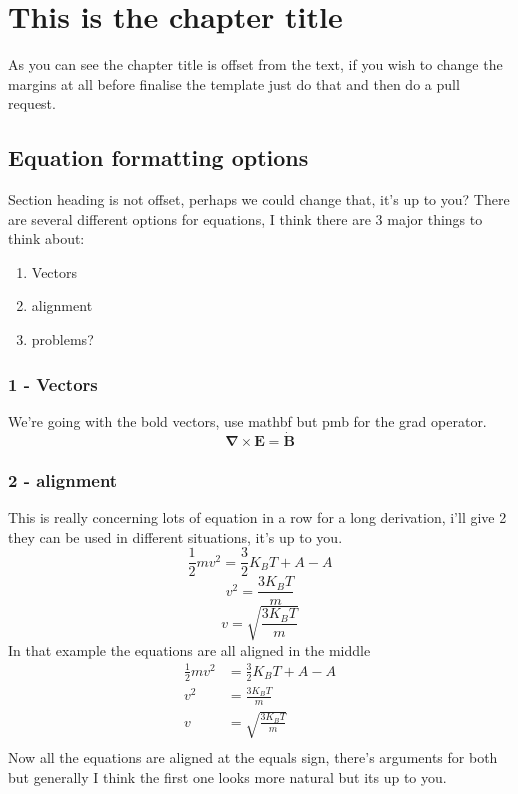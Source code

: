 \documentclass[11pt,oneside]{book}
\begin{document}
\dominitoc
\dominilof
\dominilot

\chapter{This is the chapter title}
\minitoc

\pagebreak
As you can see the chapter title is offset from the text, if you wish to change the margins at all before finalise the template just do that and then do a pull request.
%
\section{Equation formatting options}
Section heading is not offset, perhaps we could change that, it's up to you?
 There are several different options for equations, I think there are 3 major things to think about:
%
\begin{enumerate}
	\item Vectors
	\item alignment
	\item problems?
\end{enumerate}
%
\subsection{1 - Vectors}
We're going with the bold vectors, use mathbf{} but pmb for the grad operator.
%
$$\pmb{\nabla}\times\mathbf{E} = \mathbf{\dot{B}}$$%
\subsection{2 - alignment}
This is really concerning lots of equation in a row for a long derivation, i'll give 2 they can be used in different situations, it's up to you.
%
$$\frac{1}{2}mv^2=\frac{3}{2}K_BT + A - A$$
%
$$v^2=\frac{3K_BT}{m}$$
%
$$v=\sqrt{\frac{3K_BT}{m}}$$
%
In that example the equations are all aligned in the middle
%
\begin{align*}	
	\frac{1}{2}mv^2&=\frac{3}{2}K_BT + A - A\\
	v^2&=\frac{3K_BT}{m}\\
	v&=\sqrt{\frac{3K_BT}{m}}\\
\end{align*}
%
Now all the equations are aligned at the equals sign, there's arguments for both but generally I think the first one looks more natural but its up to you.
%
\end{document}
